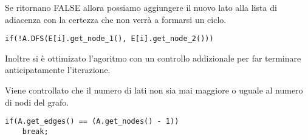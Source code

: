 \documentclass[]{article}
\begin{document}
\begin{flushleft}
Se ritornano FALSE allora possiamo aggiungere il nuovo lato alla lista di adiacenza con la certezza che non verrà a formarsi un ciclo.

\lstset{language=c++, style=mystyle, firstnumber=4}
\begin{lstlisting}
if(!A.DFS(E[i].get_node_1(), E[i].get_node_2()))
\end{lstlisting}

\medskip
Inoltre si è ottimizato l'agoritmo con un controllo addizionale per far terminare anticipatamente l'iterazione. 

Viene controllato che il numero di lati non sia mai maggiore o uguale al numero di nodi del grafo.

\lstset{language=c++, style=mystyle, firstnumber=6}
\begin{lstlisting}
if(A.get_edges() == (A.get_nodes() - 1))
    break;
\end{lstlisting}
\end{flushleft}
\end{document}
